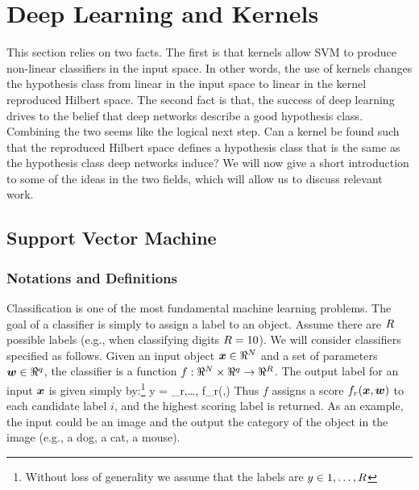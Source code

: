 \section{Deep Learning and Kernels}
This section relies on two facts.
The first is that kernels allow SVM to produce non-linear classifiers in the input space.
In other words, the use of kernels changes the hypothesis class from linear in the input space to linear in the kernel reproduced Hilbert space.
The second fact is that, the success of deep learning drives to the belief that deep networks describe a good hypothesis class.
Combining the two seems like the logical next step.
Can a kernel be found such that the reproduced Hilbert space defines a hypothesis class that is the same as the hypothesis class deep networks induce?
We will now give a short introduction to some of the ideas in the two fields, which will allow us to discuss relevant work.
\subsection{Support Vector Machine}
\subsubsection{Notations and Definitions}
Classification is one of the most fundamental machine learning problems. The goal of a classifier is simply to assign a label to an object. Assume there are $R$ possible labels (e.g., when classifying digits $R=10$). We will consider classifiers specified as follows. Given an input object $\boldsymbol{x} \in \Re^N$ and a set of parameters $\boldsymbol{w}\in\Re^q$, the classifier is a function $f: \Re^N \times \Re^q \to \Re^R$. The output label for an input $\boldsymbol{x}$ is given simply by:\footnote{Without loss of generality we assume that the labels are $y \in 1,\ldots,R$}
\be
y = \arg\max_{r,\ldots, \card} f_r(\xx,\ww)
\label{eq:argmax_classify}
\ee
Thus $f$ assigns a score $f_r(\boldsymbol{x},\boldsymbol{w})$ to each candidate label $i$, and the highest scoring label is returned.
As an example, the input could be an image and the output the category of the object in the image (e.g., a dog, a cat, a mouse). 


